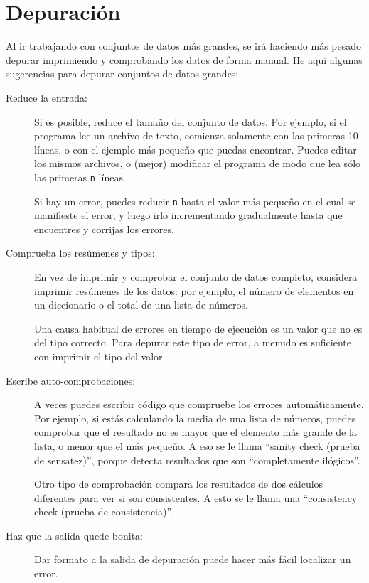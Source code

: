 \section{Depuración}

Al ir trabajando con conjuntos de datos más grandes, se irá haciendo más
pesado depurar imprimiendo y comprobando los datos de forma manual. He aquí algunas
sugerencias para depurar conjuntos de datos grandes:

\begin{description}

\item[Reduce la entrada:] Si es posible, reduce el tamaño del
conjunto de datos. Por ejemplo, si el programa lee un archivo de texto,
comienza solamente con las primeras 10 líneas, o con el ejemplo más pequeño
que puedas encontrar. Puedes editar los mismos archivos, o (mejor) modificar el
programa de modo que lea sólo las primeras {\tt n} líneas.

Si hay un error, puedes reducir {\tt n} hasta el valor
más pequeño en el cual se manifieste el error, y luego irlo incrementando gradualmente
hasta que encuentres y corrijas los errores.

\item[Comprueba los resúmenes y tipos:] En vez de imprimir y comprobar el
conjunto de datos completo, considera imprimir resúmenes de los datos: por ejemplo,
el número de elementos en un diccionario o el total de una lista de números.

Una causa habitual de errores en tiempo de ejecución es un valor que no es del tipo
correcto. Para depurar este tipo de error, a menudo es suficiente con imprimir
el tipo del valor.

\item[Escribe auto-comprobaciones:] A veces puedes escribir código que compruebe
los errores automáticamente. Por ejemplo, si estás calculando la
media de una lista de números, puedes comprobar que el resultado no
es mayor que el elemento más grande de la lista, o menor que el más
pequeño. A eso se le llama ``sanity check (prueba de sensatez)'', porque detecta
resultados que son ``completamente ilógicos''.


Otro tipo de comprobación compara los resultados de dos cálculos
diferentes para ver si son consistentes. A esto se le llama una
``consistency check (prueba de consistencia)''.

\item[Haz que la salida quede bonita:] Dar formato a la salida de depuración
puede hacer más fácil localizar un error.

\end{description}

